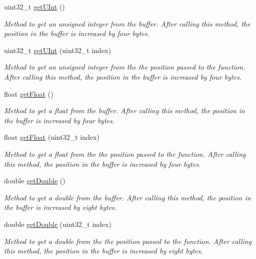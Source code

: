 \begin{DoxyCompactItemize}
uint32\_\-t \hyperlink{classBuffer_ad604cb82913c0453caa1f1ccad9ce860}{getUInt} ()
\begin{DoxyCompactList}\small\item\em Method to get an unsigned integer from the buffer. After calling this method, the position in the buffer is increased by four bytes. \item\end{DoxyCompactList}\item 
uint32\_\-t \hyperlink{classBuffer_aa05686a1ed29f3d32414d5a518033201}{getUInt} (uint32\_\-t index)
\begin{DoxyCompactList}\small\item\em Method to get an unsigned integer from the the position passed to the function. After calling this method, the position in the buffer is increased by four bytes. \item\end{DoxyCompactList}\item 
float \hyperlink{classBuffer_a129bc6d11c9125c1d29c8894880e8605}{getFloat} ()
\begin{DoxyCompactList}\small\item\em Method to get a float from the buffer. After calling this method, the position in the buffer is increased by four bytes. \item\end{DoxyCompactList}\item 
float \hyperlink{classBuffer_a9f76bac5c7796adf6713c7cd0f561e43}{getFloat} (uint32\_\-t index)
\begin{DoxyCompactList}\small\item\em Method to get a float from the the position passed to the function. After calling this method, the position in the buffer is increased by four bytes. \item\end{DoxyCompactList}\item 
double \hyperlink{classBuffer_a8a373ecd5d76516f8d3569c44adf3381}{getDouble} ()
\begin{DoxyCompactList}\small\item\em Method to get a double from the buffer. After calling this method, the position in the buffer is increased by eight bytes. \item\end{DoxyCompactList}\item 
double \hyperlink{classBuffer_a091a79452a41a318824896d65dc2978a}{getDouble} (uint32\_\-t index)
\begin{DoxyCompactList}\small\item\em Method to get a double from the the position passed to the function. After calling this method, the position in the buffer is increased by eight bytes. \item\end{DoxyCompactList}\item 

\end{DoxyCompactItemize}
